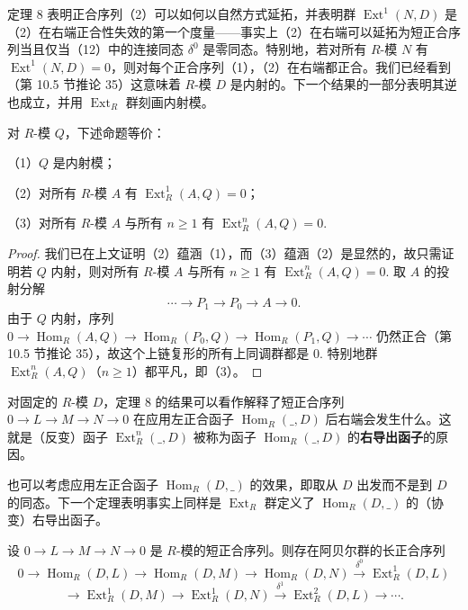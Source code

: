 定理 8 表明正合序列（2）可以如何以自然方式延拓，并表明群 \(\operatorname{Ext}^1(N, D)\) 是（2）在右端正合性失效的第一个度量——事实上（2）在右端可以延拓为短正合序列当且仅当（12）中的连接同态 \(\delta^0\) 是零同态。特别地，若对所有 \(R\)-模 \(N\) 有 \(\operatorname{Ext}^1(N, D) = 0\)，则对每个正合序列（1），（2）在右端都正合。我们已经看到（第 10.5 节推论 35）这意味着 \(R\)-模 \(D\) 是内射的。下一个结果的一部分表明其逆也成立，并用 \(\operatorname{Ext}_R\) 群刻画内射模。

\begin{proposition}\label{pro:17.9}
对 \(R\)-模 \(Q\)，下述命题等价：

（1）\(Q\) 是内射模；

（2）对所有 \(R\)-模 \(A\) 有 \(\operatorname{Ext}_R^1(A, Q) = 0\)；

（3）对所有 \(R\)-模 \(A\) 与所有 \(n \geq 1\) 有 \(\operatorname{Ext}_R^n(A, Q) = 0\).
\end{proposition}

\begin{proof}
我们已在上文证明（2）蕴涵（1），而（3）蕴涵（2）是显然的，故只需证明若 \(Q\) 内射，则对所有 \(R\)-模 \(A\) 与所有 \(n \geq 1\) 有 \(\operatorname{Ext}_R^n(A, Q) = 0\). 取 \(A\) 的投射分解
\[
\cdots \longrightarrow P_1 \longrightarrow P_0 \longrightarrow A \longrightarrow 0.
\]
由于 \(Q\) 内射，序列 \(0 \to \operatorname{Hom}_R(A, Q) \to \operatorname{Hom}_R(P_0, Q) \to \operatorname{Hom}_R(P_1, Q) \to \cdots\) 仍然正合（第 10.5 节推论 35），故这个上链复形的所有上同调群都是 0. 特别地群 \(\operatorname{Ext}_R^n(A, Q)\)（\(n \geq 1\)）都平凡，即（3）。
\end{proof}

对固定的 \(R\)-模 \(D\)，定理 8 的结果可以看作解释了短正合序列 \(0 \to L \to M \to N \to 0\) 在应用左正合函子 \(\operatorname{Hom}_R(\_, D)\) 后右端会发生什么。这就是（反变）函子 \(\operatorname{Ext}_R^n(\_, D)\) 被称为函子 \(\operatorname{Hom}_R(\_, D)\) 的\textbf{右导出函子}的原因。

也可以考虑应用左正合函子 \(\operatorname{Hom}_R(D, \_)\) 的效果，即取从 \(D\) 出发而不是到 \(D\) 的同态。下一个定理表明事实上同样是 \(\operatorname{Ext}_R\) 群定义了 \(\operatorname{Hom}_R(D, \_)\) 的（协变）右导出函子。

\begin{theorem}\label{thm:17.10}
设 \(0 \to L \to M \to N \to 0\) 是 \(R\)-模的短正合序列。则存在阿贝尔群的长正合序列
\[
0 \to \operatorname{Hom}_R(D, L) \to \operatorname{Hom}_R(D, M) \to \operatorname{Hom}_R(D, N) \xrightarrow{\delta^0} \operatorname{Ext}_R^1(D, L) \tag{17.14}
\]
\[
\to \operatorname{Ext}_R^1(D, M) \to \operatorname{Ext}_R^1(D, N) \xrightarrow{\delta^1} \operatorname{Ext}_R^2(D, L) \to \cdots.
\]
\end{theorem}

